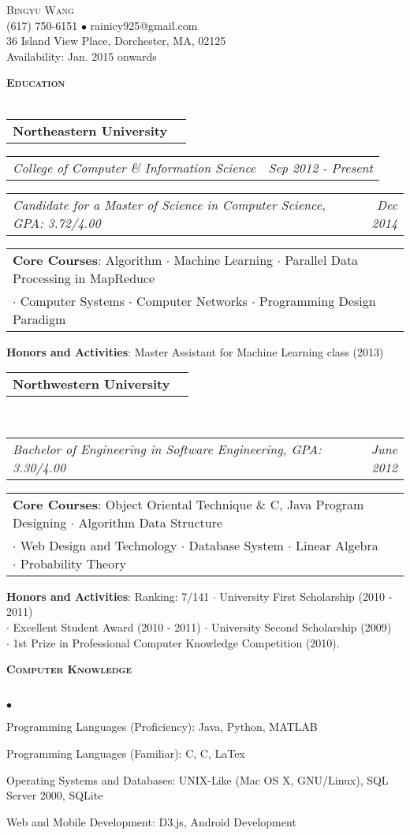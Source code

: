 \documentclass[11pt]{article}
\makeatletter
\newcommand{\lineunder}{\vspace*{-8pt} \\ \hspace*{-18pt} \hrulefill \\}
\newcommand{\header}[1]{{\hspace*{-15pt}\vspace*{6pt} \large \textsc{\textbf{#1}}} \vspace*{-6pt} \lineunder}
\newcommand{\contact}[4]{
\vspace*{-8pt}
\begin{center}
{\LARGE \scshape {#1}}\\
#2\\
#3 \\%
#4
\end{center}
\vspace*{-8pt}
}
\newenvironment{achievements}{\begin{list}{$\bullet$}{\topsep 0pt \itemsep -2pt}}{\vspace*{4pt}\end{list}}
\newcommand{\headerrow}[2]
{\begin{tabular*}{\linewidth}{l@{\extracolsep{\fill}}r}
	\hspace*{-15pt}#1 & #2 \\
\end{tabular*}}
\newcommand{\headerrowwf}[2]
{\begin{tabular*}{\linewidth}{l@{\extracolsep{\fill}}r}
	\hspace*{-15pt}#1 & #2 \\
\end{tabular*}}
\newcommand{\CPP}
 {C\nolinebreak[4]\hspace{-.05em}\raisebox{.22ex}{\footnotesize\bf ++}}
\makeatother
\begin{document}
\small
\smallskip
\vspace*{-45pt}

\contact{Bingyu Wang}
{(617) 750-6151 $\bullet$ rainicy925@gmail.com}
{36 Island View Place, Dorchester, MA, 02125}
{Availability: Jan. 2015 onwards}

\header{Education}
\headerrow
{\textbf{Northeastern University}}
{\text{Boston, MA}}
\headerrowwf
{\emph{College of Computer \& Information Science}}
{\emph{Sep 2012 - Present}}

\headerrowwf
{\emph{Candidate for a Master of Science in Computer Science, GPA: 3.72/4.00}}
{\emph{Dec 2014}}

\headerrowwf
{\textbf{Core Courses}:
Algorithm $\cdot$ Machine Learning  $\cdot$ Parallel Data Processing in MapReduce \\
\hspace*{54pt}$\cdot$ Computer Systems  $\cdot$ Computer Networks  $\cdot$   Programming Design Paradigm }
{\emph{}}

\hspace*{-8pt}\textbf{Honors and Activities}:
Master Assistant for Machine Learning class (2013)

\vspace*{2.5pt}

\headerrow
{\textbf{Northwestern University}}
{\text{Xi'an, China}}
\\
\headerrowwf
{\emph{Bachelor of Engineering in Software Engineering, GPA: 3.30/4.00}}
{\emph{June 2012}}

\headerrowwf
{\textbf{Core Courses}:
Object Oriental Technique \& \CPP, Java Program Designing  $\cdot$ Algorithm Data Structure \\
\hspace*{54pt}$\cdot$  Web Design and Technology  $\cdot$  Database System $\cdot$ Linear Algebra $\cdot$ Probability Theory}
{\emph{}}
\hspace*{-8pt}\textbf{Honors and Activities}: Ranking: 7/141 
$\cdot$ University First Scholarship (2010 - 2011)  \\
\hspace*{104pt}$\cdot$ Excellent Student Award (2010 - 2011)
$\cdot$ University Second Scholarship (2009)  \\
\hspace*{104pt}$\cdot$ 1st Prize in Professional Computer Knowledge Competition (2010).



\vspace*{2.5pt}
\header{Computer Knowledge}
\begin{achievements}
\item Programming Languages (Proficiency): Java, Python, MATLAB
\item Programming Languages (Familiar):  C, \CPP,  LaTex
\item Operating Systems and Databases: UNIX-Like (Mac OS X, GNU/Linux), SQL Server 2000, SQLite
\item Web and Mobile Development: D3.js, Android Development
\end{achievements}
\end{document}

